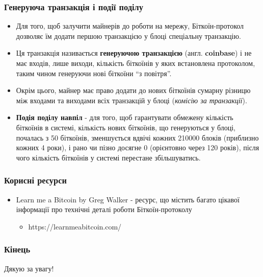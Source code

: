 \documentclass{beamer}
\begin{document}
\begin{frame}
  \frametitle{Генеруюча транзакція і події поділу}
  \begin{small}
    \begin{itemize}
    \item Для того, щоб залучити майнерів до роботи на мережу, Біткоїн-протокол
      дозволяє їм додати першою транзакцією у блоці спеціальну транзакцію.
    \item Ця транзакція називається \textbf{генеруючою транзакцією}
      (англ. \textbf{coinbase}) і не має входів, лише виходи, кількість біткоїнів
      у яких встановлена протоколом, таким чином генеруючи нові біткоїни ``з
      повітря''.
    \item Окрім цього, майнер має право додати до нових біткоїнів сумарну різницю
      між входами та виходами всіх транзакцій у блоці (\textit{комісію за транзакції}).
    \item \textbf{Подія поділу навпіл} - для того, щоб гарантувати обмежену
      кількість біткоїнів в системі, кількість нових біткоїнів, що генеруються у
      блоці, почалась з 50 біткоїнів, зменшується вдвічі кожних 210000 блоків
      (приблизно кожних 4 роки), і рано чи пізно досягне 0 (орієнтовно через 120
      років), після чого кількість біткоїнів у системі перестане збільшуватись.
    \end{itemize}
  \end{small}
\end{frame}

\begin{frame}
  \frametitle{Корисні ресурси}
  \begin{itemize}
  \item Learn me a Bitcoin by Greg Walker - ресурс, що містить багато цікавої
    інформації про технічні деталі роботи Біткоїн-протоколу
    \begin{itemize}
    \item https://learnmeabitcoin.com/
    \end{itemize}
  \end{itemize}
\end{frame}

\begin{frame}
  \frametitle{Кінець}
  \begin{center}
    Дякую за увагу!
  \end{center}
\end{frame}
\end{document}
